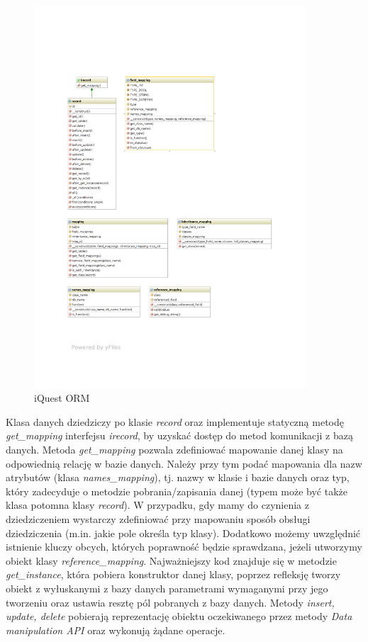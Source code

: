 \begin{figure}[H]
\begin{center}
\includegraphics[width=0.9\textwidth]{figures/lw/orm.pdf} 
\end{center}
\caption{iQuest ORM}
\label{fig:iquest-orm}
\end{figure}
Klasa danych dziedziczy po klasie \emph{record} oraz implementuje statyczną metodę \emph{get\_mapping} interfejsu \emph{irecord}, by uzyskać dostęp do metod komunikacji z bazą danych. Metoda \emph{get\_mapping} pozwala zdefiniować mapowanie danej klasy na odpowiednią relację w bazie danych. Należy przy tym podać mapowania dla nazw atrybutów (klasa \emph{names\_mapping}), tj. nazwy w klasie i bazie danych oraz typ, który zadecyduje o metodzie pobrania/zapisania danej (typem może być także klasa potomna klasy \emph{record}). W przypadku, gdy mamy do czynienia z dziedziczeniem wystarczy zdefiniować przy mapowaniu sposób obsługi dziedziczenia (m.in. jakie pole określa typ klasy). Dodatkowo możemy uwzględnić istnienie kluczy obcych, których poprawność będzie sprawdzana, jeżeli utworzymy obiekt klasy \emph{reference\_mapping}. Najważniejszy kod znajduje się w metodzie \emph{get\_instance}, która pobiera konstruktor danej klasy, poprzez refleksję tworzy obiekt z wyłuskanymi z bazy danych parametrami wymaganymi przy jego tworzeniu oraz ustawia resztę pól pobranych z bazy danych. Metody \emph{insert, update, delete} pobierają reprezentację obiektu oczekiwanego przez metody \emph{Data manipulation API} oraz wykonują żądane operacje.\\
